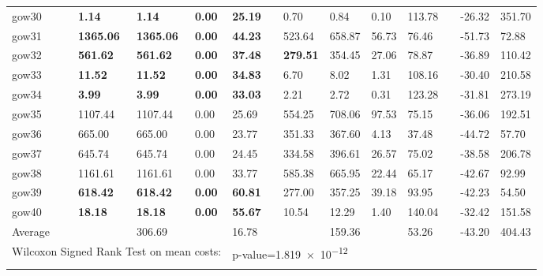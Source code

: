 \begin{table}[H]
\begin{tabularx}{\textwidth}{llXXXXlXXXXlXX}
    gow30 && \textbf{1.14} & \textbf{1.14} & \textbf{0.00} & \textbf{25.19} && 0.70 & 0.84 & 0.10 & 113.78 && -26.32 & 351.70\\
    gow31 && \textbf{1365.06} & \textbf{1365.06} & \textbf{0.00} & \textbf{44.23} && 523.64 & 658.87 & 56.73 & 76.46 && -51.73 & 72.88\\
    gow32 && \textbf{561.62} & \textbf{561.62} & \textbf{0.00} & \textbf{37.48} && \textbf{279.51} & 354.45 & 27.06 & 78.87 && -36.89 & 110.42\\
    gow33 && \textbf{11.52} & \textbf{11.52} & \textbf{0.00} & \textbf{34.83} && 6.70 & 8.02 & 1.31 & 108.16 && -30.40 & 210.58\\
    gow34 && \textbf{3.99} & \textbf{3.99} & \textbf{0.00} & \textbf{33.03} && 2.21 & 2.72 & 0.31 & 123.28 && -31.81 & 273.19\\
    gow35 && 1107.44 & 1107.44 & 0.00 & 25.69 && 554.25 & 708.06 & 97.53 & 75.15 && -36.06 & 192.51\\
    gow36 && 665.00 & 665.00 & 0.00 & 23.77 && 351.33 & 367.60 & 4.13 & 37.48 && -44.72 & 57.70\\
    gow37 && 645.74 & 645.74 & 0.00 & 24.45 && 334.58 & 396.61 & 26.57 & 75.02 && -38.58 & 206.78\\
    gow38 && 1161.61 & 1161.61 & 0.00 & 33.77 && 585.38 & 665.95 & 22.44 & 65.17 && -42.67 & 92.99\\
    gow39 && \textbf{618.42} & \textbf{618.42} & \textbf{0.00} & \textbf{60.81} && 277.00 & 357.25 & 39.18 & 93.95 && -42.23 & 54.50\\
    gow40 && \textbf{18.18} & \textbf{18.18} & \textbf{0.00} & \textbf{55.67} && 10.54 & 12.29 & 1.40 & 140.04 && -32.42 & 151.58\\
    \hline
    \multicolumn{1}{l}{Average} &&& 306.69 && 16.78 &&& 159.36 && 53.26 && -43.20 & 404.43\\
    \hline
    \multicolumn{5}{l}{Wilcoxon Signed Rank Test on mean costs:} & \multicolumn{9}{l}{p-value=\num{1.819e-12}}\\
        \lasthline
    \end{tabularx}
    \normalsize
\end{table}
